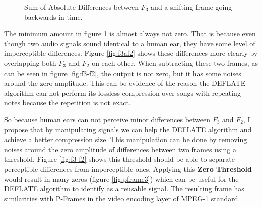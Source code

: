 \begin{figure}[ht] 
    \centering
    
    \caption{Sum of Absolute Differences between $F_3$ and a shifting frame going backwards in time.}
    \label{fig:shifting}
\end{figure}

The minimum amount in figure \ref{fig:shifting} is almost always not zero. That is because even though two audio signals sound identical to a human ear, they have some level of imperceptible differences. Figure \ref{fig:f3af2} shows these differences more clearly by overlapping both $F_3$ and $F_2$ on each other. When subtracting these two frames, as can be seen in figure \ref{fig:f3-f2}, the output is not zero, but it has some noises around the zero amplitude. This can be evidence of the reason the DEFLATE algorithm can not perform its lossless compression over songs with repeating notes because the repetition is not exact.

So because human ears can not perceive minor differences between $F_3$ and $F_2$, I propose that by manipulating signals we can help the DEFLATE algorithm and achieve a better compression size. This manipulation can be done by removing noises around the zero amplitude of differences between two frames using a threshold. Figure \ref{fig:f3-f2} shows this threshold should be able to separate perceptible differences from imperceptible ones. Applying this \textbf{Zero Threshold} would result in many zeros (figure \ref{fig:pframe3}) which can be useful for the DEFLATE algorithm to identify as a reusable signal. The resulting frame has similarities with P-Frames in the video encoding layer of MPEG-1 standard\cite{mpeg1-1993-video}.


